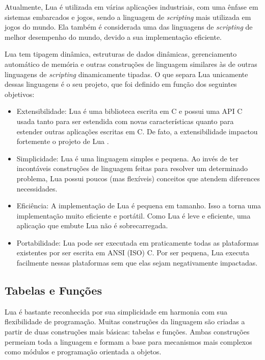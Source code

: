 Atualmente, Lua é utilizada em várias aplicações industriais, com uma ênfase em sistemas embarcados e jogos, sendo a linguagem de {\em scripting} mais utilizada em jogos do mundo. Ela também é considerada uma das linguagens de {\em scripting} de melhor desempenho do mundo, devido a sua implementação eficiente.

Lua tem tipagem dinâmica, estruturas de dados dinâmicas, gerenciamento automático de memória e outras construções de linguagem similares às de outras linguagens de {\em scripting} dinamicamente tipadas. O que separa Lua unicamente dessas linguagens é o seu projeto, que foi definido em função dos seguintes objetivos:

\begin{itemize}
    \item Extensibilidade: Lua é uma biblioteca escrita em C e possui uma API C usada tanto para ser estendida com novas características quanto para estender outras aplicações escritas em C. De fato, a extensibilidade impactou fortemente o projeto de Lua \cite{Ierusalimschy2011passing}.
    \item Simplicidade: Lua é uma linguagem simples e pequena. Ao invés de ter incontáveis construções de linguagem feitas para resolver um determinado problema, Lua possui poucos (mas flexíveis) conceitos que atendem diferences necessidades.
    \item Eficiência: A implementação de Lua é pequena em tamanho. Isso a torna uma implementação muito eficiente e portátil. Como Lua é leve e eficiente, uma aplicação que embute Lua não é sobrecarregada.
    \item Portabilidade: Lua pode ser executada em praticamente todas as plataformas existentes por ser escrita em ANSI (ISO) C. Por ser pequena, Lua executa facilmente nessas plataformas sem que elas sejam negativamente impactadas.
\end{itemize}

\subsection{Tabelas e Funções}
\label{subsec:tables}

Lua é bastante reconhecida por sua simplicidade em harmonia com sua flexibilidade de programação. Muitas construções da linguagem são criadas a partir de duas construções mais básicas: tabelas e funções. Ambas construções permeiam toda a linguagem e formam a base para mecanismos mais complexos como módulos e programação orientada a objetos.


